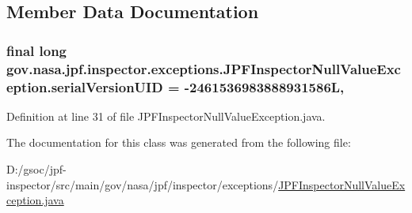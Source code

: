 \subsection{Member Data Documentation}
\subsubsection[{\texorpdfstring{serial\+Version\+U\+ID}{serialVersionUID}}]{\setlength{\rightskip}{0pt plus 5cm}final long gov.\+nasa.\+jpf.\+inspector.\+exceptions.\+J\+P\+F\+Inspector\+Null\+Value\+Exception.\+serial\+Version\+U\+ID = -\/2461536983888931586L\hspace{0.3cm}{\ttfamily [static]}, {\ttfamily [private]}}\hypertarget{classgov_1_1nasa_1_1jpf_1_1inspector_1_1exceptions_1_1_j_p_f_inspector_null_value_exception_aa604f576f6419c31ae42f5c42e6c2780}{}\label{classgov_1_1nasa_1_1jpf_1_1inspector_1_1exceptions_1_1_j_p_f_inspector_null_value_exception_aa604f576f6419c31ae42f5c42e6c2780}


Definition at line 31 of file J\+P\+F\+Inspector\+Null\+Value\+Exception.\+java.



The documentation for this class was generated from the following file\+:\begin{DoxyCompactItemize}
\item 
D\+:/gsoc/jpf-\/inspector/src/main/gov/nasa/jpf/inspector/exceptions/\hyperlink{_j_p_f_inspector_null_value_exception_8java}{J\+P\+F\+Inspector\+Null\+Value\+Exception.\+java}\end{DoxyCompactItemize}
